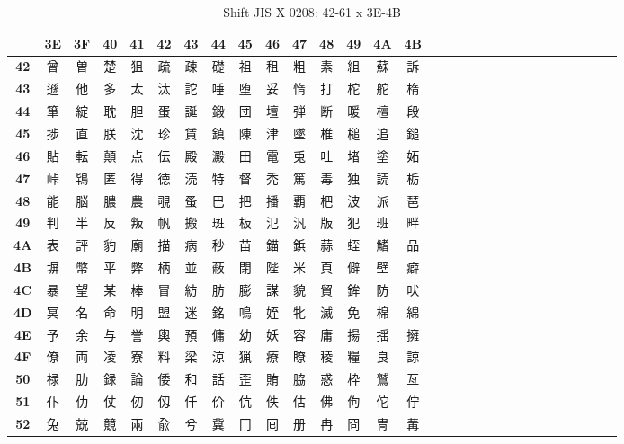 \begin{table}[H]
\Fontified
\centering
\caption{Shift JIS X 0208: 42-61 x 3E-4B}
\begin{tabular}{|Sc|Sc|Sc|Sc|Sc|Sc|Sc|Sc|Sc|Sc|Sc|Sc|Sc|Sc|Sc|}
\hline
 & \textbf{3E} & \textbf{3F} & \textbf{40} & \textbf{41} & \textbf{42} & \textbf{43} & \textbf{44} & \textbf{45} & \textbf{46} & \textbf{47} & \textbf{48} & \textbf{49} & \textbf{4A} & \textbf{4B} \\ \hline
\textbf{42} & 曾 & 曽 & 楚 & 狙 & 疏 & 疎 & 礎 & 祖 & 租 & 粗 & 素 & 組 & 蘇 & 訴 \\ \hline
\textbf{43} & 遜 & 他 & 多 & 太 & 汰 & 詑 & 唾 & 堕 & 妥 & 惰 & 打 & 柁 & 舵 & 楕 \\ \hline
\textbf{44} & 箪 & 綻 & 耽 & 胆 & 蛋 & 誕 & 鍛 & 団 & 壇 & 弾 & 断 & 暖 & 檀 & 段 \\ \hline
\textbf{45} & 捗 & 直 & 朕 & 沈 & 珍 & 賃 & 鎮 & 陳 & 津 & 墜 & 椎 & 槌 & 追 & 鎚 \\ \hline
\textbf{46} & 貼 & 転 & 顛 & 点 & 伝 & 殿 & 澱 & 田 & 電 & 兎 & 吐 & 堵 & 塗 & 妬 \\ \hline
\textbf{47} & 峠 & 鴇 & 匿 & 得 & 徳 & 涜 & 特 & 督 & 禿 & 篤 & 毒 & 独 & 読 & 栃 \\ \hline
\textbf{48} & 能 & 脳 & 膿 & 農 & 覗 & 蚤 & 巴 & 把 & 播 & 覇 & 杷 & 波 & 派 & 琶 \\ \hline
\textbf{49} & 判 & 半 & 反 & 叛 & 帆 & 搬 & 斑 & 板 & 氾 & 汎 & 版 & 犯 & 班 & 畔 \\ \hline
\textbf{4A} & 表 & 評 & 豹 & 廟 & 描 & 病 & 秒 & 苗 & 錨 & 鋲 & 蒜 & 蛭 & 鰭 & 品 \\ \hline
\textbf{4B} & 塀 & 幣 & 平 & 弊 & 柄 & 並 & 蔽 & 閉 & 陛 & 米 & 頁 & 僻 & 壁 & 癖 \\ \hline
\textbf{4C} & 暴 & 望 & 某 & 棒 & 冒 & 紡 & 肪 & 膨 & 謀 & 貌 & 貿 & 鉾 & 防 & 吠 \\ \hline
\textbf{4D} & 冥 & 名 & 命 & 明 & 盟 & 迷 & 銘 & 鳴 & 姪 & 牝 & 滅 & 免 & 棉 & 綿 \\ \hline
\textbf{4E} & 予 & 余 & 与 & 誉 & 輿 & 預 & 傭 & 幼 & 妖 & 容 & 庸 & 揚 & 揺 & 擁 \\ \hline
\textbf{4F} & 僚 & 両 & 凌 & 寮 & 料 & 梁 & 涼 & 猟 & 療 & 瞭 & 稜 & 糧 & 良 & 諒 \\ \hline
\textbf{50} & 禄 & 肋 & 録 & 論 & 倭 & 和 & 話 & 歪 & 賄 & 脇 & 惑 & 枠 & 鷲 & 亙 \\ \hline
\textbf{51} & 仆 & 仂 & 仗 & 仞 & 仭 & 仟 & 价 & 伉 & 佚 & 估 & 佛 & 佝 & 佗 & 佇 \\ \hline
\textbf{52} & 兔 & 兢 & 竸 & 兩 & 兪 & 兮 & 冀 & 冂 & 囘 & 册 & 冉 & 冏 & 冑 & 冓 \\ \hline

\end{tabular}
\end{table}

